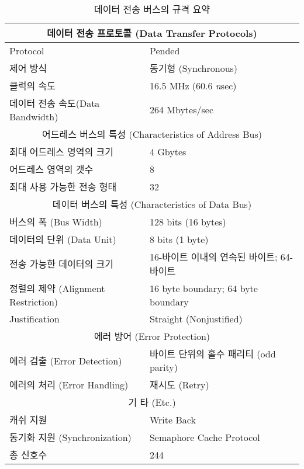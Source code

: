 %
\begin{table}[htbp]
\caption{데이터 전송 버스의 규격 요약}\label{table:dtb-spec}
   \begin{center}
\begingroup
\setlength{\tabcolsep}{6pt} %
\renewcommand{\arraystretch}{0.9} %
   \begin{tabular}{|l l|} \hline
      \multicolumn{2}{|c|}{데이터 전송 프로토콜 (Data Transfer Protocols)} \\ \hline
      Protocol & Pended \\
      제어 방식 & 동기형 (Synchronous) \\
      클럭의 속도 & 16.5 MHz (60.6 {\it n\/}sec) \\
      데이터 전송 속도(Data Bandwidth) & 264 Mbytes/sec\\ \hline
      \multicolumn{2}{|c|}{어드레스 버스의 특성 (Characteristics of Address Bus)} \\ \hline
      최대 어드레스 영역의 크기 & 4 Gbytes \\
      어드레스 영역의 갯수 & 8 \\
      최대 사용 가능한 전송 형태 & 32 \\ \hline
      \multicolumn{2}{|c|}{데이터 버스의 특성 (Characteristics of Data Bus)} \\ \hline
      버스의 폭 (Bus Width) & 128 bits (16 bytes) \\
      데이터의 단위 (Data Unit) & 8 bits (1 byte) \\
      전송 가능한 데이터의 크기 & 16-바이트 이내의 연속된 바이트; 64-바이트 \\
      정렬의 제약 (Alignment Restriction) & 16 byte boundary; 64 byte boundary \\
      Justification & Straight (Nonjustified) \\ \hline
      \multicolumn{2}{|c|}{에러 방어 (Error Protection)} \\ \hline
      에러 검출 (Error Detection) & 바이트 단위의 홀수 패리티 (odd parity) \\
      에러의 처리 (Error Handling) & 재시도 (Retry) \\ \hline
      \multicolumn{2}{|c|}{기 타 (Etc.)} \\ \hline
      캐쉬 지원 & Write Back \\
      동기화 지원 (Synchronization) & Semaphore Cache Protocol \\
      총 신호수 & 244\\ \hline
   \end{tabular}
\endgroup
   \end{center}
\end{table}
%
